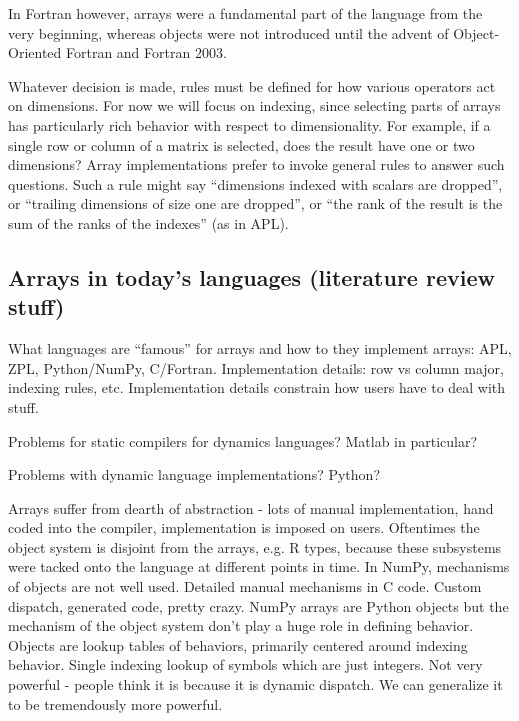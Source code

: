\documentclass[preprint]{sigplanconf}
\begin{document}
In Fortran however, arrays were a fundamental part of the language from the very beginning, whereas objects were not introduced until the advent of Object-Oriented Fortran and Fortran 2003.



Whatever decision is made, rules must be defined for how various operators
act on dimensions. For now we will focus on indexing, since selecting
parts of arrays has particularly rich behavior with respect to
dimensionality. For example, if a single row or column of a matrix is
selected, does the result have one or two dimensions? Array implementations
prefer to invoke general rules to answer such questions. Such a rule might
say ``dimensions indexed with scalars are dropped'', or ``trailing
dimensions of size one are dropped'', or ``the rank of the result
is the sum of the ranks of the indexes'' (as in APL).

\subsection{Arrays in today's languages (literature review stuff)}

What languages are ``famous'' for arrays and how to they implement
arrays: APL, ZPL, Python/NumPy, C/Fortran. Implementation details:
row vs column major, indexing rules, etc. Implementation details constrain
how users have to deal with stuff.

Problems for static compilers for dynamics languages? Matlab in particular?

Problems with dynamic language implementations? Python?

Arrays suffer from dearth of abstraction - lots of manual implementation,
hand coded into the compiler, implementation is imposed on users.
Oftentimes the object system is disjoint from the arrays, e.g. R types,
because these subsystems were tacked onto the language at different
points in time. In NumPy, mechanisms of objects are not well used.
Detailed manual mechanisms in C code. Custom dispatch, generated code,
pretty crazy. NumPy arrays are Python objects but the mechanism of
the object system don't play a huge role in defining behavior. Objects
are lookup tables of behaviors, primarily centered around indexing
behavior. Single indexing lookup of symbols which are just integers.
Not very powerful - people think it is because it is dynamic dispatch.
We can generalize it to be tremendously more powerful.
\end{document}
